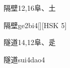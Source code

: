 \begin{entry}{隔壁}{12,16}{⾩、⼟}
  \begin{phonetics}{隔壁}{ge2bi4}[][HSK 5]
  \end{phonetics}
\end{entry}

\begin{entry}{隧道}{14,12}{⾩、⾡}
  \begin{phonetics}{隧道}{sui4dao4}
  \end{phonetics}
\end{entry}


